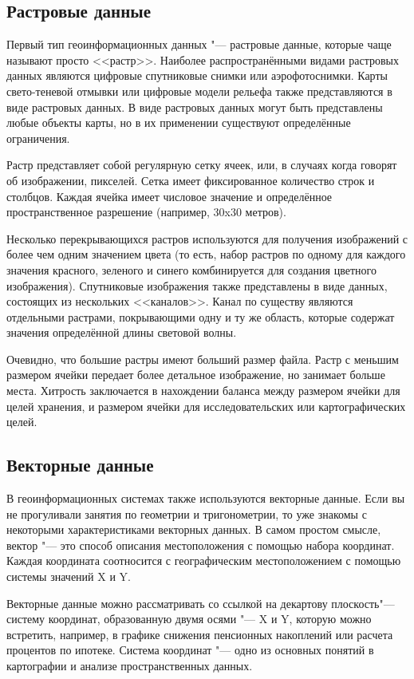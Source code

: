 \subsection{Растровые данные}\label{label_rasterdata}

Первый тип геоинформационных данных "--- растровые данные, которые чаще называют
просто <<растр>>. Наиболее распространёнными видами растровых данных являются
цифровые спутниковые снимки или аэрофотоснимки. Карты свето-теневой
отмывки или цифровые модели рельефа также представляются в виде растровых
данных. В виде растровых данных могут быть представлены любые объекты карты,
но в их применении существуют определённые ограничения.

Растр представляет собой регулярную сетку ячеек, или, в случаях когда
говорят об изображении, пикселей. Сетка имеет фиксированное количество
строк и столбцов. Каждая ячейка имеет числовое значение и определённое
пространственное разрешение (например, 30x30 метров).

Несколько перекрывающихся растров используются для получения изображений
с более чем одним значением цвета (то есть, набор растров по одному для каждого
значения красного, зеленого и синего комбинируется для создания
цветного изображения). Спутниковые изображения также представлены в виде данных,
состоящих из нескольких <<каналов>>. Канал по существу являются отдельными растрами,
покрывающими одну и ту же область, которые содержат значения определённой
длины световой волны.

Очевидно, что большие растры имеют больший размер файла. Растр с меньшим
размером ячейки передает более детальное изображение, но занимает больше места.
Хитрость заключается в нахождении баланса между размером ячейки для целей
хранения, и размером ячейки для исследовательских или картографических целей.

\subsection{Векторные данные}\label{label_vectordata}

В геоинформационных системах также используются векторные данные. Если
вы не прогуливали занятия по геометрии и тригонометрии, то уже знакомы
с некоторыми характеристиками векторных данных. В самом простом смысле,
вектор "--- это способ описания местоположения с помощью набора координат.
Каждая координата соотносится с географическим местоположением с помощью
системы значений X и Y.

Векторные данные можно рассматривать со ссылкой на декартову плоскость"---
систему координат, образованную двумя осями "--- X и Y, которую можно встретить,
например, в графике снижения пенсионных накоплений или расчета процентов по ипотеке.
Система координат "--- одно из основных понятий в картографии и анализе пространственных
данных.

